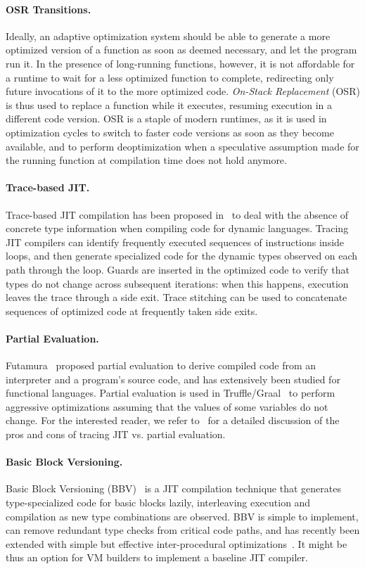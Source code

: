 \paragraph*{OSR Transitions.} Ideally, an adaptive optimization system should be able to generate a more optimized version of a function as soon as deemed necessary, and let the program run it. In the presence of long-running functions, however, it is not affordable for a runtime to wait for a less optimized function to complete, redirecting only future invocations of it to the more optimized code. {\em On-Stack Replacement} (OSR) is thus used to replace a function while it executes, resuming execution in a different code version. OSR is a staple of modern runtimes, as it is used in optimization cycles to switch to faster code versions as soon as they become available, and to perform deoptimization when a speculative assumption made for the running function at compilation time does not hold anymore.

\paragraph*{Trace-based JIT.} Trace-based JIT compilation has been proposed in~\cite{Gal09} to deal with the absence of concrete type information when compiling code for dynamic languages. Tracing JIT compilers can identify frequently executed sequences of instructions inside loops, and then generate specialized code for the dynamic types observed on each path through the loop. Guards are inserted in the optimized code to verify that types do not change across subsequent iterations: when this happens, execution leaves the trace through a side exit. Trace stitching can be used to concatenate sequences of optimized code at frequently taken side exits.

\paragraph*{Partial Evaluation.} Futamura~\cite{Futamura99} proposed partial evaluation to derive compiled code from an interpreter and a program's source code, and has extensively been studied for functional languages. Partial evaluation is used in Truffle/Graal~\cite{Wurthinger13} to perform aggressive optimizations assuming that the values of some variables do not change. For the interested reader, we refer to~\cite{Marr15} for a detailed discussion of the pros and cons of tracing JIT vs. partial evaluation.

\paragraph*{Basic Block Versioning.} Basic Block Versioning (BBV)~\cite{ChevalierBoisvert15} is a JIT compilation technique that generates type-specialized code for basic blocks lazily, interleaving execution and compilation as new type combinations are observed. BBV is simple to implement, can remove redundant type checks from critical code paths, and has recently been extended with simple but effective inter-procedural optimizations~\cite{ChevalierBoisvert16}. It might be thus an option for VM builders to implement a baseline JIT compiler.

